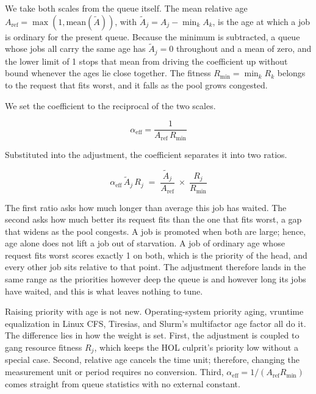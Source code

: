 \documentclass{ieeetj}
\begin{document}
We take both scales from the queue itself. The mean relative age $A_{\text{ref}} = \max(1,\text{mean}(\tilde A))$, with $\tilde A_j = A_j - \min_k A_k$, is the age at which a job is ordinary for the present queue. Because the minimum is subtracted, a queue whose jobs all carry the same age has $\tilde A_j=0$ throughout and a mean of zero, and the lower limit of 1 stops that mean from driving the coefficient up without bound whenever the ages lie close together. The fitness $R_{\min}=\min_k R_k$ belongs to the request that fits worst, and it falls as the pool grows congested.

We set the coefficient to the reciprocal of the two scales.

\begin{equation}
\alpha_{\text{eff}} = \frac{1}{A_{\text{ref}}\,R_{\min}}
\label{eq:auto-alpha}
\end{equation}

Substituted into the adjustment, the coefficient separates it into two ratios.

\begin{equation}
\alpha_{\text{eff}}\,\tilde A_j\, R_j \;=\; \frac{\tilde A_j}{A_{\text{ref}}} \;\times\; \frac{R_j}{R_{\min}}
\label{eq:alphaeff-define}
\end{equation}

The first ratio asks how much longer than average this job has waited. The second asks how much better its request fits than the one that fits worst, a gap that widens as the pool congests. A job is promoted when both are large; hence, age alone does not lift a job out of starvation. A job of ordinary age whose request fits worst scores exactly 1 on both, which is the priority of the head, and every other job sits relative to that point. The adjustment therefore lands in the same range as the priorities however deep the queue is and however long its jobs have waited, and this is what leaves nothing to tune.

Raising priority with age is not new. Operating-system priority aging, vruntime equalization in Linux CFS, Tiresias\cite{gu2019tiresias}, and Slurm's multifactor age factor all do it. The difference lies in how the weight is set. First, the adjustment is coupled to gang resource fitness $R_j$, which keeps the HOL culprit's priority low without a special case. Second, relative age cancels the time unit; therefore, changing the measurement unit or period requires no conversion. Third, $\alpha_{\text{eff}}=1/(A_{\text{ref}}R_{\min})$ comes straight from queue statistics with no external constant.
\end{document}
